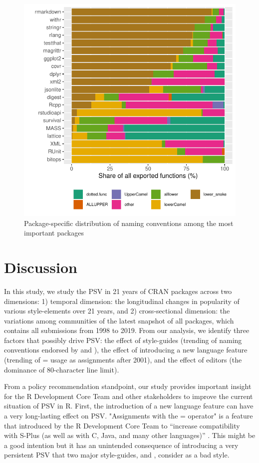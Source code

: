 \begin{figure}[htbp]
  \centering
  \includegraphics{fig7}
  \caption{Package-specific distribution of naming conventions among the most important packages}
  \label{figure:fig7}
\end{figure}

\section{Discussion}

In this study, we study the PSV in 21 years of CRAN packages across two dimensions: 1) temporal dimension: the longitudinal changes in popularity of various style-elements over 21 years, and 2) cross-sectional dimension: the variations among communities of the latest snapshot of all packages, which contains all submissions from 1998 to 2019. From our analysis, we identify three factors that possibly drive PSV: the effect of style-guides (trending of naming conventions endorsed by \citet{tidyverse} and \citet{google}), the effect of introducing a new language feature (trending of = usage as assignments after 2001), and the effect of editors (the dominance of 80-character line limit).

From a policy recommendation standpoint, our study provides important insight for the R Development Core Team and other stakeholders to improve the current situation of PSV in R. First, the introduction of a new language feature can have a very long-lasting effect on PSV. "Assignments with the = operator" is a feature that introduced by the R Development Core Team to ``increase compatibility with S-Plus (as well as with C, Java, and many other languages)'' \citep{chambers}. This might be a good intention but it has an unintended consequence of introducing a very persistent PSV that two major style-guides, \citet{tidyverse} and \citet{google}, consider as a bad style.

